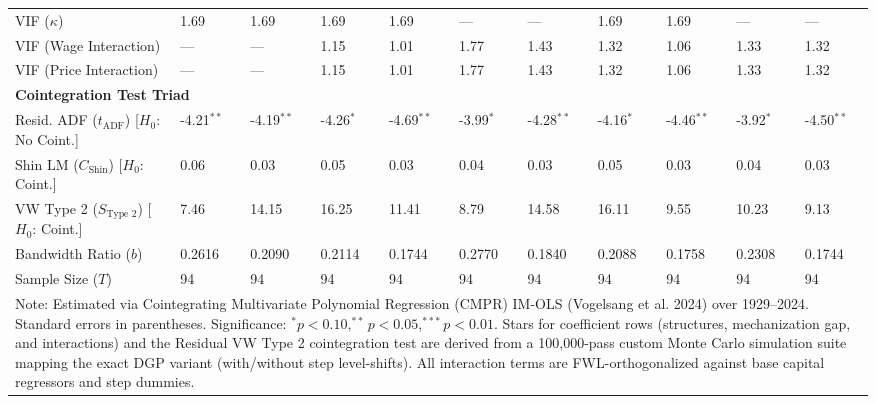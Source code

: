 \begin{table}[H]
\begin{tabular}{p{3.8cm}p{1.1cm}p{1.1cm}p{1.1cm}p{1.1cm}p{1.1cm}p{1.1cm}p{1.1cm}p{1.1cm}p{1.1cm}p{1.1cm}}
VIF ($\kappa$) & 1.69 & 1.69 & 1.69 & 1.69 & --- & --- & 1.69 & 1.69 & --- & --- \\
VIF (Wage Interaction) & --- & --- & 1.15 & 1.01 & 1.77 & 1.43 & 1.32 & 1.06 & 1.33 & 1.32 \\
VIF (Price Interaction) & --- & --- & 1.15 & 1.01 & 1.77 & 1.43 & 1.32 & 1.06 & 1.33 & 1.32 \\
\midrule
\multicolumn{11}{l}{\textbf{Cointegration Test Triad}} \\
Resid. ADF ($t_{\text{ADF}}$) [$H_0$: No Coint.] & -4.21$^{**}$ & -4.19$^{**}$ & -4.26$^{*}$ & -4.69$^{**}$ & -3.99$^{*}$ & -4.28$^{**}$ & -4.16$^{*}$ & -4.46$^{**}$ & -3.92$^{*}$ & -4.50$^{**}$ \\
Shin LM ($C_{\text{Shin}}$) [$H_0$: Coint.] & 0.06 & 0.03 & 0.05 & 0.03 & 0.04 & 0.03 & 0.05 & 0.03 & 0.04 & 0.03 \\
VW Type 2 ($S_{\text{Type 2}}$) [$H_0$: Coint.] & 7.46 & 14.15 & 16.25 & 11.41 & 8.79 & 14.58 & 16.11 & 9.55 & 10.23 & 9.13 \\
\midrule
Bandwidth Ratio ($b$) & 0.2616 & 0.2090 & 0.2114 & 0.1744 & 0.2770 & 0.1840 & 0.2088 & 0.1758 & 0.2308 & 0.1744 \\
Sample Size ($T$) & 94 & 94 & 94 & 94 & 94 & 94 & 94 & 94 & 94 & 94 \\
\bottomrule
\multicolumn{11}{p{15cm}}{\footnotesize Note: Estimated via Cointegrating Multivariate Polynomial Regression (CMPR) IM-OLS (Vogelsang et al. 2024) over 1929--2024. Standard errors in parentheses. Significance: $^* p < 0.10, ^{**} p < 0.05, ^{***} p < 0.01$. Stars for coefficient rows (structures, mechanization gap, and interactions) and the Residual VW Type 2 cointegration test are derived from a 100,000-pass custom Monte Carlo simulation suite mapping the exact DGP variant (with/without step level-shifts). All interaction terms are FWL-orthogonalized against base capital regressors and step dummies.}
\end{tabular}
\end{table}
